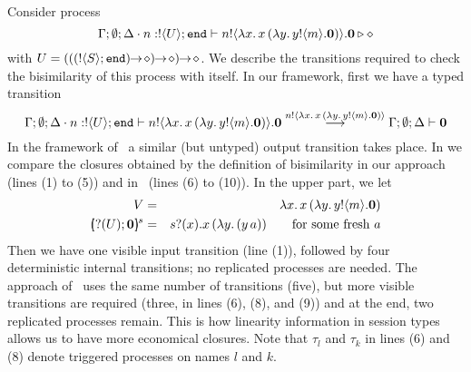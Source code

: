 
\begin{example}

	Consider process
	$$\Gamma; \emptyset; \Delta \cdot n: ! \langle U \rangle ; \mathtt{end} \vdash n ! \langle \lambda x.\,x\, {(}\lambda y.\,y ! \langle m \rangle . \mathbf{0}) \rangle . \mathbf{0} \triangleright \diamond$$
	with $U = \shot{(\shot{(\shot{(\btout{S} \tinact)})})}$. 
	We describe the transitions required to check the bisimilarity
	of this process with itself. 
	In our framework, first we have a typed transition
	$$
	\Gamma; \emptyset; \Delta \cdot n: ! \langle U \rangle ; \mathtt{end} \vdash n ! \langle \lambda x.\,x\, {(}\lambda y.\,y ! \langle m \rangle . \mathbf{0}) \rangle . \mathbf{0} \stackrel{n ! \langle \lambda x.\,x\, {(}\lambda y.\,y ! \langle m \rangle . \mathbf{0}) \rangle}{\longrightarrow}\Gamma; \emptyset; \Delta \vdash \mathbf{0}
	$$
	In the framework of~\cite{JeffreyR05} a similar (but untyped) output transition takes place.
    In  we compare the closures obtained by the definition of bisimilarity in our approach (lines (1) to (5)) and in~\cite{JeffreyR05} (lines (6) to (10)).
    In the upper part, we let 
    \begin{eqnarray*}
    V & = & \abs{x}{\appl{x}(\abs{y}{\bout{y}{m}} \inact)} \\
	\mapchar{\btinp{U} \inact}{s} & = & \binp{s}{x} \appl{x}{(\abs{y}{(\appl{y}{a}))}}\qquad \textrm{for some fresh $a$}
	\end{eqnarray*}
	Then we have one visible input transition (line (1)), followed by four deterministic internal transitions; no replicated processes are needed.
	The approach of~\cite{JeffreyR05} uses 
	the same number of transitions (five), but more visible transitions are required
	(three, in lines (6), (8), and (9)) and at the end, two replicated processes remain.
	This is how linearity information in session types allows us to have more economical closures.
	Note that $\tau_l$ and $\tau_k$ in lines (6) and (8) denote triggered processes on names $l$ and $k$.
	
	
	

\end{example}
